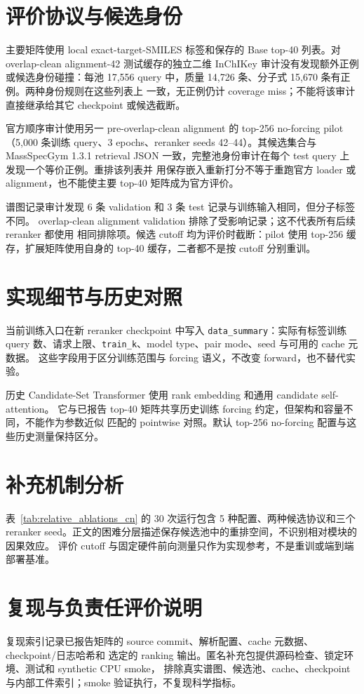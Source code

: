 \documentclass[UTF8,11pt]{ctexart}
\begin{document}
\appendix

\section{评价协议与候选身份}

主要矩阵使用 local exact-target-SMILES 标签和保存的 Base top-40 列表。对 overlap-clean
alignment-42 测试缓存的独立二维 InChIKey 审计没有发现额外正例或候选身份碰撞：每池
17,556 query 中，质量 14,726 条、分子式 15,670 条有正例。两种身份规则在这些列表上
一致，无正例仍计 coverage miss；不能将该审计直接继承给其它 checkpoint 或候选截断。

官方顺序审计使用另一 pre-overlap-clean alignment 的 top-256 no-forcing pilot
（5,000 条训练 query、3 epochs、reranker seeds 42--44）。其候选集合与 MassSpecGym 1.3.1
retrieval JSON 一致，完整池身份审计在每个 test query 上发现一个等价正例。重排该列表并
用保存嵌入重新打分不等于重跑官方 loader 或 alignment，也不能使主要 top-40 矩阵成为官方评价。

谱图记录审计发现 6 条 validation 和 3 条 test 记录与训练输入相同，但分子标签不同。
overlap-clean alignment validation 排除了受影响记录；这不代表所有后续 reranker 都使用
相同排除项。候选 cutoff 均为评价时截断：pilot 使用 top-256 缓存，扩展矩阵使用自身的
top-40 缓存，二者都不是按 cutoff 分别重训。

\section{实现细节与历史对照}

当前训练入口在新 reranker checkpoint 中写入 \texttt{data\_summary}：实际有标签训练
query 数、请求上限、\texttt{train\_k}、model type、pair mode、seed 与可用的 cache 元数据。
这些字段用于区分训练范围与 forcing 语义，不改变 forward，也不替代实验。

历史 Candidate-Set Transformer 使用 rank embedding 和通用 candidate self-attention。
它与已报告 top-40 矩阵共享历史训练 forcing 约定，但架构和容量不同，不能作为参数近似
匹配的 pointwise 对照。默认 top-256 no-forcing 配置与这些历史测量保持区分。

\section{补充机制分析}

表~\ref{tab:relative_ablations_cn} 的 30 次运行包含 5 种配置、两种候选协议和三个 reranker
seed。正文的困难分层描述保存候选池中的重排空间，不识别相对模块的因果效应。
评价 cutoff 与固定硬件前向测量只作为实现参考，不是重训或端到端部署基准。

\section{复现与负责任评价说明}

复现索引记录已报告矩阵的 source commit、解析配置、cache 元数据、checkpoint/日志哈希和
选定的 ranking 输出。匿名补充包提供源码检查、锁定环境、测试和 synthetic CPU smoke，
排除真实谱图、候选池、cache、checkpoint 与内部工件索引；smoke 验证执行，不复现科学指标。



\end{document}
